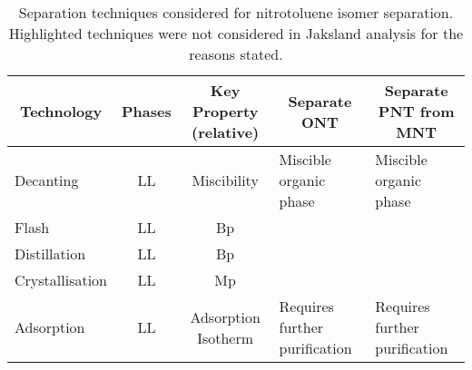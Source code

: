 \begin{landscape}

\begin{table}[H]
\centering
\caption{Separation techniques considered for nitrotoluene isomer separation. Highlighted techniques were not considered in Jaksland analysis for the reasons stated.}
\label{tab:separation techniques}
\begin{tabular}{lccll}
\toprule
\multicolumn{1}{c}{{Technology}} & {Phases} & {Key Property (relative)} & \multicolumn{1}{c}{{\textbf{Separate ONT}}} & \multicolumn{1}{c}{{\textbf{Separate PNT from MNT}}} \\ \midrule
Decanting                                                                     & LL                            & Miscibility                                    & \cellcolor[HTML]{F8CBAD}Miscible organic phase                                            & \cellcolor[HTML]{F8CBAD}Miscible organic phase                                                      \\
Flash                                                                         & LL                            & Bp                                             &                                                                                           &                                                                                                     \\
Distillation                                                                  & LL                            & Bp                                             &                                                                                           &                                                                                                     \\
Crystallisation                                                               & LL                            & Mp                                             &                                                                                           &                                                                                                     \\
Adsorption                                                                    & LL                            & Adsorption Isotherm                            & \cellcolor[HTML]{F8CBAD}Requires further purification                                     & \cellcolor[HTML]{F8CBAD}Requires further purification                                               \\

\end{tabular}
\end{table}
\end{landscape}
